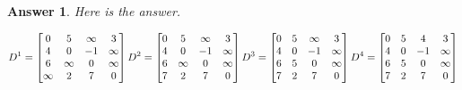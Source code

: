 \documentclass[11pt]{article}
\newtheorem{answer}{Answer}
\begin{document}
\begin{answer}
 \label{ans:4}
 Here is the answer.
\begin{center}
\[
D^1=
\begin{bmatrix}
0 & 5 & \infty & 3 \\
4 & 0 & -1 & \infty \\
6 & \infty & 0 & \infty \\
\infty & 2 & 7 & 0
\end{bmatrix}

\bigskip

D^2=
\begin{bmatrix}
0 & 5 & \infty & 3 \\
4 & 0 & -1 & \infty \\
6 & \infty & 0 & \infty \\
7 & 2 & 7 & 0
\end{bmatrix}

\bigskip

D^3=
\begin{bmatrix}
0 & 5 & \infty & 3 \\
4 & 0 & -1 & \infty \\
6 & 5 & 0 & \infty \\
7 & 2 & 7 & 0
\end{bmatrix}

\bigskip

D^4=
\begin{bmatrix}
0 & 5 & 4 & 3 \\
4 & 0 & -1 & \infty \\
6 & 5 & 0 & \infty \\
7 & 2 & 7 & 0
\end{bmatrix}
\]
\end{center}
\end{answer}
\end{document}
